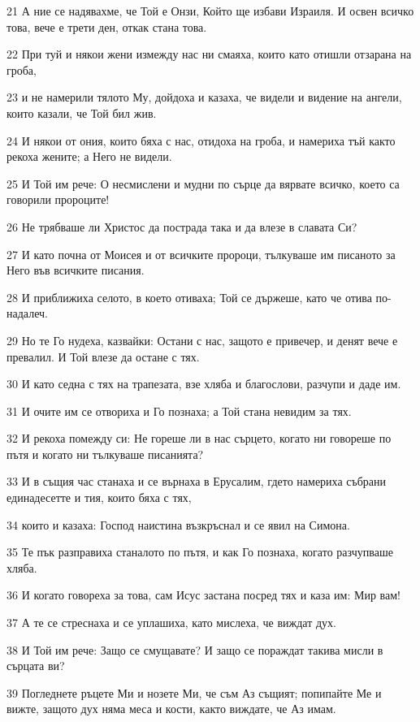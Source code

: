 \par 21 А ние се надявахме, че Той е Онзи, Който ще избави Израиля. И освен всичко това, вече е трети ден, откак стана това.
\par 22 При туй и някои жени измежду нас ни смаяха, които като отишли отзарана на гроба,
\par 23 и не намерили тялото Му, дойдоха и казаха, че видели и видение на ангели, които казали, че Той бил жив.
\par 24 И някои от ония, които бяха с нас, отидоха на гроба, и намериха тъй както рекоха жените; а Него не видели.
\par 25 И Той им рече: О несмислени и мудни по сърце да вярвате всичко, което са говорили пророците!
\par 26 Не трябваше ли Христос да пострада така и да влезе в славата Си?
\par 27 И като почна от Моисея и от всичките пророци, тълкуваше им писаното за Него във всичките писания.
\par 28 И приближиха селото, в което отиваха; Той се държеше, като че отива по-надалеч.
\par 29 Но те Го нудеха, казвайки: Остани с нас, защото е привечер, и денят вече е превалил. И Той влезе да остане с тях.
\par 30 И като седна с тях на трапезата, взе хляба и благослови, разчупи и даде им.
\par 31 И очите им се отвориха и Го познаха; а Той стана невидим за тях.
\par 32 И рекоха помежду си: Не гореше ли в нас сърцето, когато ни говореше по пътя и когато ни тълкуваше писанията?
\par 33 И в същия час станаха и се върнаха в Ерусалим, гдето намериха събрани единадесетте и тия, които бяха с тях,
\par 34 които и казаха: Господ наистина възкръснал и се явил на Симона.
\par 35 Те пък разправиха станалото по пътя, и как Го познаха, когато разчупваше хляба.
\par 36 И когато говореха за това, сам Исус застана посред тях и каза им: Мир вам!
\par 37 А те се стреснаха и се уплашиха, като мислеха, че виждат дух.
\par 38 И Той им рече: Защо се смущавате? И защо се пораждат такива мисли в сърцата ви?
\par 39 Погледнете ръцете Ми и нозете Ми, че съм Аз същият; попипайте Ме и вижте, защото дух няма меса и кости, както виждате, че Аз имам.
